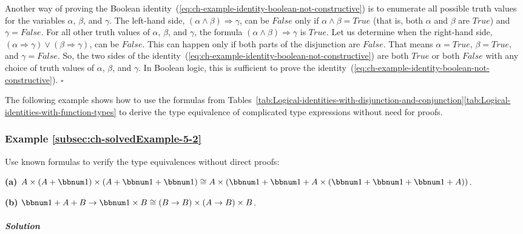 Another way of proving the Boolean identity~(\ref{eq:ch-example-identity-boolean-not-constructive})
is to enumerate all possible truth values for the variables $\alpha$,
$\beta$, and $\gamma$. The left-hand side, $\left(\alpha\wedge\beta\right)\Rightarrow\gamma$,
can be $False$ only if $\alpha\wedge\beta=True$ (that is, both $\alpha$
and $\beta$ are $True$) and $\gamma=False$. For all other truth
values of $\alpha$, $\beta$, and $\gamma$, the formula $\left(\alpha\wedge\beta\right)\Rightarrow\gamma$
is $True$. Let us determine when the right-hand side, $(\alpha\Rightarrow\gamma)\vee(\beta\Rightarrow\gamma)$,
can be $False$. This can happen only if both parts of the disjunction
are $False$. That means $\alpha=True$, $\beta=True$, and $\gamma=False$.
So, the two sides of the identity~(\ref{eq:ch-example-identity-boolean-not-constructive})
are both $True$ or both $False$ with any choice of truth values
of $\alpha$, $\beta$, and $\gamma$. In Boolean logic, this is sufficient
to prove the identity~(\ref{eq:ch-example-identity-boolean-not-constructive}).
$\square$

The following example shows how to use the formulas from Tables~\ref{tab:Logical-identities-with-disjunction-and-conjunction}\textendash \ref{tab:Logical-identities-with-function-types}
to derive the type equivalence of complicated type expressions without
need for proofs.

\subsubsection{Example \label{subsec:ch-solvedExample-5-2}\ref{subsec:ch-solvedExample-5-2}}

Use known formulas to verify the type equivalences without direct
proofs:

\textbf{(a)} $A\times\left(A+\bbnum 1\right)\times\left(A+\bbnum 1+\bbnum 1\right)\cong A\times\left(\bbnum 1+\bbnum 1+A\times\left(\bbnum 1+\bbnum 1+\bbnum 1+A\right)\right)$.

\textbf{(b)} $\bbnum 1+A+B\rightarrow\bbnum 1\times B\cong\left(B\rightarrow B\right)\times\left(A\rightarrow B\right)\times B$.

\subparagraph{Solution}

